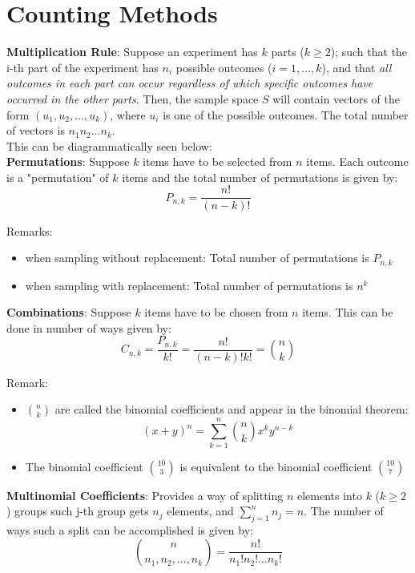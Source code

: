 \documentclass[english, 11pt]{article}
\begin{document}
\section{Counting Methods}
{\bf Multiplication Rule}: Suppose an experiment has $k$ parts ($k \ge 2$); such that the i-th part of the experiment has $n_i$ possible outcomes ($i=1, \ldots, k$), and that {\it all outcomes in each part can occur regardless of which specific outcomes have occurred in the other parts}. Then, the sample space $S$ will contain vectors of the form $(u_1, u_2, \ldots, u_k)$, where $u_i$ is one of the possible outcomes. The total number of vectors is $n_1 n_2 \ldots n_k $. \\ This can be diagrammatically seen below: \\

{\bf Permutations}: Suppose $k$ items have to be selected from $n$ items. Each outcome is a "permutation" of $k$ items and the total number of permutations is given by:
\[ P_{n, k} = \frac{n!}{(n-k)!} \]

Remarks:
\begin{itemize}
\item when sampling without replacement: Total number of permutations is $P_{n, k}$
\item when sampling with replacement: Total number of permutations is $n^k$ \\
\end{itemize}

{\bf Combinations}: Suppose $k$ items have to be chosen from $n$ items. This can be done in number of ways given by:
\[ C_{n, k} = \frac{P_{n, k}}{k!} = \frac{n!}{(n-k)! k!} = {n \choose k}\]

Remark:
\begin{itemize}
\item ${n \choose k}$ are called the binomial coefficients and appear in the binomial theorem:
\[ (x+y)^n = \sum_{k=1}^n {n \choose k} x^k y^{n-k} \]
\item The binomial coefficient ${10 \choose 3}$ is equivalent to the binomial coefficient ${10 \choose 7}$ \\
\end{itemize}

{\bf Multinomial Coefficients}: Provides a way of splitting $n$ elements into $k$ ($k \ge 2$) groups such j-th group gets $n_j$ elements, and $\sum_{j=1}^n n_j = n$. The number of ways such a split can be accomplished is given by:
\[ {n \choose {n_1, n_2, \ldots, n_k}} = \frac{n!}{n_1! n_2! \ldots n_k!} \]
\end{document}
